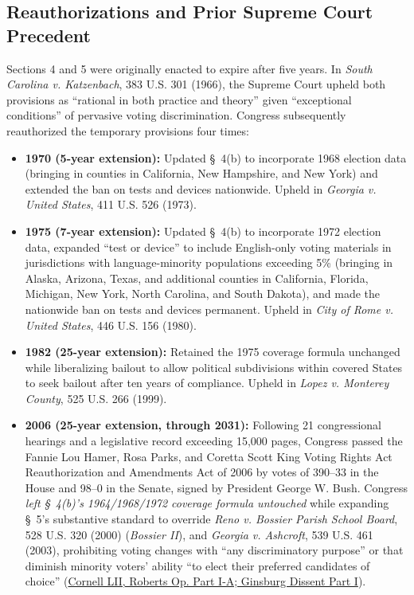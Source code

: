 \documentclass[12pt]{article}
\begin{document}
\subsection{Reauthorizations and Prior Supreme Court Precedent}
Sections 4 and 5 were originally enacted to expire after five years. In \emph{South Carolina v. Katzenbach}, 383 U.S. 301 (1966), the Supreme Court upheld both provisions as ``rational in both practice and theory'' given ``exceptional conditions'' of pervasive voting discrimination. Congress subsequently reauthorized the temporary provisions four times:
\begin{itemize}
    \item \textbf{1970 (5-year extension):} Updated \S~4(b) to incorporate 1968 election data (bringing in counties in California, New Hampshire, and New York) and extended the ban on tests and devices nationwide. Upheld in \emph{Georgia v. United States}, 411 U.S. 526 (1973).
    \item \textbf{1975 (7-year extension):} Updated \S~4(b) to incorporate 1972 election data, expanded ``test or device'' to include English-only voting materials in jurisdictions with language-minority populations exceeding 5\% (bringing in Alaska, Arizona, Texas, and additional counties in California, Florida, Michigan, New York, North Carolina, and South Dakota), and made the nationwide ban on tests and devices permanent. Upheld in \emph{City of Rome v. United States}, 446 U.S. 156 (1980).
    \item \textbf{1982 (25-year extension):} Retained the 1975 coverage formula unchanged while liberalizing bailout to allow political subdivisions within covered States to seek bailout after ten years of compliance. Upheld in \emph{Lopez v. Monterey County}, 525 U.S. 266 (1999).
    \item \textbf{2006 (25-year extension, through 2031):} Following 21 congressional hearings and a legislative record exceeding 15,000 pages, Congress passed the Fannie Lou Hamer, Rosa Parks, and Coretta Scott King Voting Rights Act Reauthorization and Amendments Act of 2006 by votes of 390--33 in the House and 98--0 in the Senate, signed by President George W. Bush. Congress \emph{left \S~4(b)'s 1964/1968/1972 coverage formula untouched} while expanding \S~5's substantive standard to override \emph{Reno v. Bossier Parish School Board}, 528 U.S. 320 (2000) (\emph{Bossier II}), and \emph{Georgia v. Ashcroft}, 539 U.S. 461 (2003), prohibiting voting changes with ``any discriminatory purpose'' or that diminish minority voters' ability ``to elect their preferred candidates of choice'' (\href{https://www.law.cornell.edu/supremecourt/text/12-96}{Cornell LII, Roberts Op. Part I-A; Ginsburg Dissent Part I}).
\end{itemize}
\end{document}
